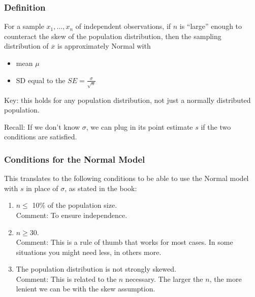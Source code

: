 \documentclass[slides]{beamer}
\newcommand{\blue}[1]{\textcolor{blue2}{#1}}
\newcommand{\xbar}{\overline{x}}
\begin{document}
\begin{frame}
\frametitle{Definition}

For a sample $x_1, \ldots, x_n$ of \blue{independent} observations, if $n$ is ``large'' enough to counteract the skew of the population distribution, then the sampling distribution of $\xbar$ is approximately Normal with
\begin{itemize}
\item mean $\mu$
\item SD equal to the $SE=\frac{\sigma}{\sqrt{n}}$
\end{itemize}

\vspace{0.25cm}

\pause\blue{Key}:  this holds for any population distribution, not just a normally distributed population.  

\vspace{0.25cm}

\pause \blue{Recall}: If we don't know $\sigma$, we can plug in its point estimate $s$ if the two conditions are satisfied.  


\end{frame}


\begin{frame}
\frametitle{Conditions for the Normal Model}

This translates to the following conditions to be able to use the Normal model with $s$ in place of $\sigma$, as stated in the book:

\begin{enumerate}
\pause\item $n\leq$ 10\% of the population size.\\
\pause Comment:  To ensure independence.
\pause\item $n \geq 30$.\\
\pause Comment:  This is a \blue{rule of thumb} that works for most cases.  In some situations you might need less, in others more.
\pause \item The population distribution is not strongly skewed.\\
Comment: This is related to the $n$ necessary.  The larger the $n$, the more lenient we can be with the skew assumption.
\end{enumerate}

\end{frame}
\end{document}
